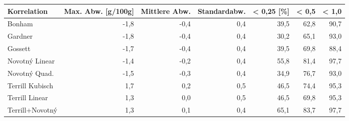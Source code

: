 \begin{tabular}{lrrrrrr}
\toprule
    Korrelation &  Max. Abw. [g/100g] &  Mittlere Abw. &  Standardabw. &  < 0,25 [\%] &  < 0,5 &  < 1,0 \\
\midrule
         Bonham &                -1,8 &           -0,4 &           0,4 &        39,5 &   62,8 &   90,7 \\
        Gardner &                -1,8 &           -0,4 &           0,4 &        30,2 &   65,1 &   93,0 \\
        Gossett &                -1,7 &           -0,4 &           0,4 &        39,5 &   69,8 &   88,4 \\
 Novotný Linear &                -1,4 &           -0,2 &           0,4 &        55,8 &   81,4 &   97,7 \\
  Novotný Quad. &                -1,5 &           -0,3 &           0,4 &        34,9 &   76,7 &   93,0 \\
Terrill Kubisch &                 1,7 &            0,2 &           0,5 &        46,5 &   74,4 &   95,3 \\
 Terrill Linear &                 1,3 &            0,0 &           0,5 &        46,5 &   69,8 &   95,3 \\
Terrill+Novotný &                 1,3 &            0,1 &           0,4 &        65,1 &   83,7 &   97,7 \\
\bottomrule
\end{tabular}
